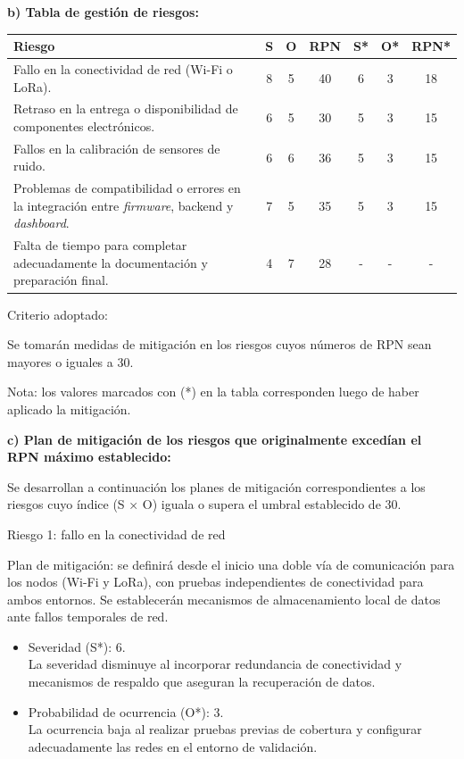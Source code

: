 \documentclass[
11pt, %
]{charter}
\begin{document}
\textbf{b) Tabla de gestión de riesgos:}     

\begin{table}[htpb]
\centering
\begin{tabularx}{\linewidth}{@{}|X|c|c|c|c|c|c|@{}}
\hline
\rowcolor[HTML]{C0C0C0} 
Riesgo & S & O & RPN & S* & O* & RPN* \\ \hline
Fallo en la conectividad de red (Wi-Fi o LoRa).      &  8 &  5 &  40   &  6  &  3  &   18   \\ \hline
Retraso en la entrega o disponibilidad de componentes electrónicos.       & 6  &  5 &  30   &  5  &  3  &  15    \\ \hline
Fallos en la calibración de sensores de ruido.       &  6 &  6 &   36  &  5  &  3  &   15   \\ \hline
Problemas de compatibilidad o errores en la integración entre \textit{firmware}, backend y \textit{dashboard}.       & 7  & 5  &  35   &  5  & 3   & 15     \\ \hline
Falta de tiempo para completar adecuadamente la documentación y preparación final.       & 4  &  7 &  28   &  -  & -   &   -   \\ \hline
\end{tabularx}%
\end{table}

Criterio adoptado: 

Se tomarán medidas de mitigación en los riesgos cuyos números de RPN sean mayores o iguales a 30.

Nota: los valores marcados con (*) en la tabla corresponden luego de haber aplicado la mitigación.

\textbf{c) Plan de mitigación de los riesgos que originalmente excedían el RPN máximo establecido:}
 
Se desarrollan a continuación los planes de mitigación correspondientes a los riesgos cuyo índice (S × O) iguala o supera el umbral establecido de 30.

Riesgo 1: fallo en la conectividad de red

Plan de mitigación: se definirá desde el inicio una doble vía de comunicación para los nodos (Wi-Fi y LoRa), con pruebas independientes de conectividad para ambos entornos. Se establecerán mecanismos de almacenamiento local de datos ante fallos temporales de red.

\begin{itemize}
	\item Severidad (S*): 6.\\
	La severidad disminuye al incorporar redundancia de conectividad y mecanismos de respaldo que aseguran la recuperación de datos.
	\item Probabilidad de ocurrencia (O*): 3.\\
	La ocurrencia baja al realizar pruebas previas de cobertura y configurar adecuadamente las redes en el entorno de validación.
\end{itemize}
\end{document}
